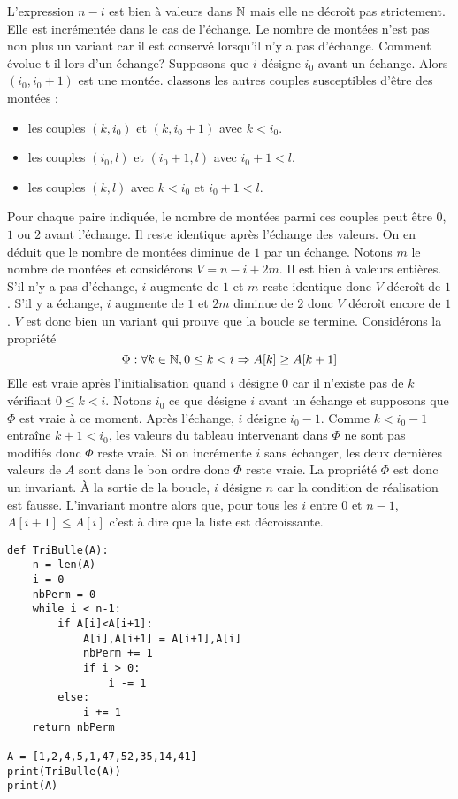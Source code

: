 L'expression $n-i$ est bien à valeurs dans $\mathbb{N}$ mais elle ne décroît pas strictement. Elle est incrémentée dans le cas de l'échange. Le nombre de montées n'est pas non plus un variant car il est conservé lorsqu'il n'y a pas d'échange. Comment évolue-t-il lors d'un échange?\newline
Supposons que $i$ désigne $i_0$ avant un échange. Alors $(i_0,i_0+1)$ est une montée. classons les autres couples susceptibles d'être des montées : 
\begin{itemize}
  \item les couples $(k,i_0)$ et $(k,i_0+1)$ avec $k<i_0$.
  \item les couples $(i_0,l)$ et $(i_0+1,l)$ avec $i_0+1 < l$.
  \item les couples $(k,l)$ avec $k<i_0$ et $i_0+1<l$.
\end{itemize}
Pour chaque paire indiquée, le nombre de montées parmi ces couples peut être $0$, $1$ ou $2$ avant l'échange. Il reste identique après l'échange des valeurs. On en déduit que le nombre de montées diminue de $1$ par un échange.\newline
Notons $m$ le nombre de montées et considérons $V = n-i +2m$. Il est bien à valeurs entières. S'il n'y a pas d'échange, $i$ augmente de $1$ et $m$ reste identique donc $V$ décroît de $1$. S'il y a échange, $i$ augmente de $1$ et $2m$ diminue de $2$ donc $V$ décroît encore de $1$.  $V$ est donc bien un variant qui prouve que la boucle se termine.\newline
Considérons la propriété
\begin{displaymath}
\Phi : \forall k\in \mathbb{N}, 0 \leq k < i \Rightarrow A[k]\geq A[k+1]   
\end{displaymath}
Elle est vraie après l'initialisation quand $i$ désigne $0$ car il n'existe pas de $k$ vérifiant $0\leq k <i$.\newline
Notons $i_0$ ce que désigne $i$ avant un échange et supposons que $\Phi$ est vraie à ce moment. Après l'échange, $i$ désigne $i_0-1$. Comme $k<i_0-1$ entraîne $k+1<i_0$, les valeurs du tableau intervenant dans $\Phi$ ne sont pas modifiés donc $\Phi$ reste vraie. Si on incrémente $i$ sans échanger, les deux dernières valeurs de $A$ sont dans le bon ordre donc $\Phi$ reste vraie. 
La propriété $\Phi$ est donc un invariant.\newline
\`A la sortie de la boucle, $i$ désigne $n$ car la condition de réalisation est fausse. L'invariant montre alors que, pour tous les $i$ entre $0$ et $n-1$, $A[i+1]\leq A[i]$ c'est à dire que la liste est décroissante.

\begin{verbatim}
def TriBulle(A):
    n = len(A)
    i = 0
    nbPerm = 0
    while i < n-1:
        if A[i]<A[i+1]:
            A[i],A[i+1] = A[i+1],A[i]
            nbPerm += 1
            if i > 0:
                i -= 1
        else:
            i += 1
    return nbPerm

A = [1,2,4,5,1,47,52,35,14,41]
print(TriBulle(A))
print(A)  
\end{verbatim}
